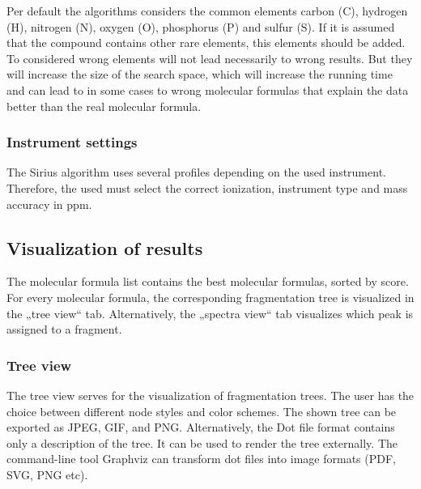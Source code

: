 \documentclass[a4paper,11pt]{article}
\begin{document}
 Per default the algorithms considers the common elements carbon (C), hydrogen (H), nitrogen (N), oxygen (O), phosphorus (P) and sulfur (S). 
 If it is assumed that the compound contains other rare elements, this elements should be added. To considered wrong elements will not lead necessarily 
 to wrong results. But they will increase the size of the search space, which will increase the running time and can lead to in some cases 
 to wrong molecular formulas that explain the data better than the real molecular formula.
 
 \subsubsection{Instrument settings}
 
 The Sirius algorithm uses several profiles depending on the used instrument. 
 Therefore, the used must select the correct ionization, instrument type  and mass accuracy in ppm.
 
 \subsection{Visualization of results}
 
 
 The molecular formula list contains the best molecular formulas, sorted by score. For every molecular formula, 
 the corresponding fragmentation tree is visualized in the „tree view“ tab. Alternatively, the „spectra view“ 
 tab visualizes which peak is assigned to a fragment.
 
 \subsubsection{Tree view}
 
 The tree view serves for the visualization of fragmentation trees. 
 The user has the choice between different node styles and  color schemes. 
 The shown tree can be exported as JPEG, GIF,  and PNG. 
 Alternatively, the Dot file format contains only a description of the tree. 
 It can be used to render the tree externally. The command-line tool Graphviz can 
 transform dot files into image formats (PDF, SVG, PNG etc).
 
 
\end{document}
